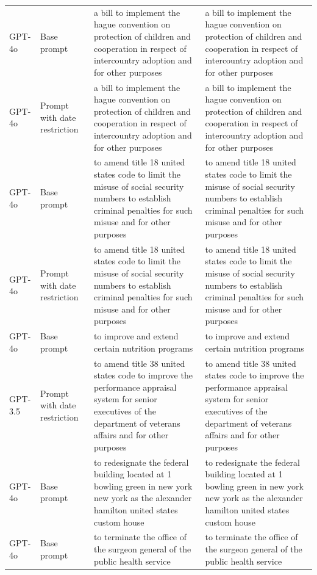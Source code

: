 \begin{longtable}{>{\raggedright\arraybackslash}p{1.4cm}>{\raggedright\arraybackslash}p{1.4cm}>{\raggedright\arraybackslash}p{5.5cm}>{\raggedright\arraybackslash}p{5.5cm}}
GPT-4o & Base prompt & a bill to implement the hague convention on protection of children and cooperation in respect of intercountry adoption and for other purposes & a bill to implement the hague convention on protection of children and cooperation in respect of intercountry adoption and for other purposes\\
GPT-4o & Prompt with date restriction & a bill to implement the hague convention on protection of children and cooperation in respect of intercountry adoption and for other purposes & a bill to implement the hague convention on protection of children and cooperation in respect of intercountry adoption and for other purposes\\
GPT-4o & Base prompt & to amend title 18 united states code to limit the misuse of social security numbers to establish criminal penalties for such misuse and for other purposes & to amend title 18 united states code to limit the misuse of social security numbers to establish criminal penalties for such misuse and for other purposes\\
GPT-4o & Prompt with date restriction & to amend title 18 united states code to limit the misuse of social security numbers to establish criminal penalties for such misuse and for other purposes & to amend title 18 united states code to limit the misuse of social security numbers to establish criminal penalties for such misuse and for other purposes\\
GPT-4o & Base prompt & to improve and extend certain nutrition programs & to improve and extend certain nutrition programs\\
GPT-3.5 & Prompt with date restriction & to amend title 38 united states code to improve the performance appraisal system for senior executives of the department of veterans affairs and for other purposes & to amend title 38 united states code to improve the performance appraisal system for senior executives of the department of veterans affairs and for other purposes\\
GPT-4o & Base prompt & to redesignate the federal building located at 1 bowling green in new york new york as the alexander hamilton united states custom house & to redesignate the federal building located at 1 bowling green in new york new york as the alexander hamilton united states custom house\\
GPT-4o & Base prompt & to terminate the office of the surgeon general of the public health service & to terminate the office of the surgeon general of the public health service\\

\end{longtable}
